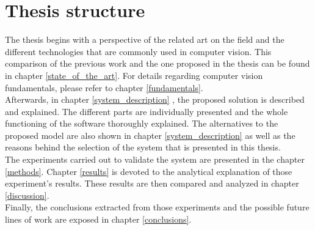 \newpage
\section{Thesis structure}

The thesis begins with a perspective of the related art on the field and the different technologies that are commonly used in computer vision. This comparison of the previous work and the one proposed in the thesis can be found in chapter \ref{state_of_the_art}.
For details regarding computer vision fundamentals, please refer to chapter \ref{fundamentals}. 
\\

Afterwards, in chapter \ref{system_description} , the proposed solution is described and explained. The different parts are individually presented and the whole functioning of the software thoroughly explained. The alternatives to the proposed model are also shown in chapter \ref{system_description} as well as the reasons behind the selection of the system that is presented in this thesis. 
\\

The experiments carried out to validate the system are presented in the chapter \ref{methods}. Chapter \ref{results} is devoted to the analytical explanation of those experiment's results. 
These results are then compared and analyzed in chapter \ref{discussion}. 
\\

Finally, the conclusions extracted from those experiments and the possible future lines of work are exposed in chapter \ref{conclusions}. 
